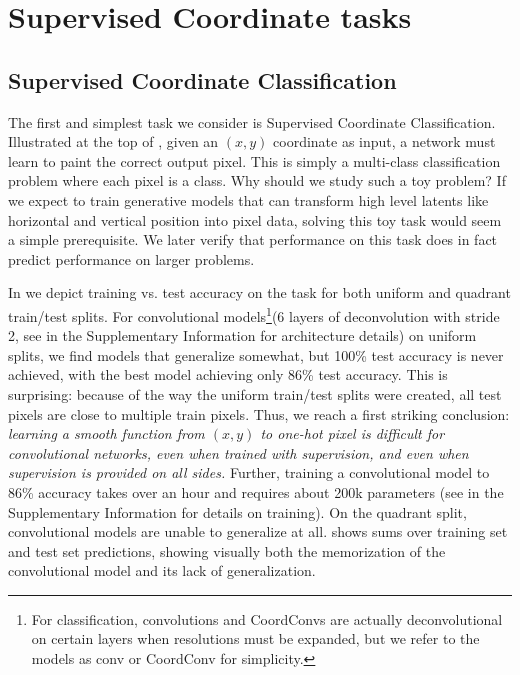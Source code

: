 \documentclass{article}
\begin{document}
\vspace*{-.5em}
\section{Supervised Coordinate tasks}
\vspace*{-.6em}

\subsection{Supervised Coordinate Classification}
\vspace*{-.6em}

The first and simplest task we consider is Supervised Coordinate Classification.
Illustrated at the top of , given an $(x,y)$ coordinate as input, a network must learn to paint the correct output pixel. This is simply a multi-class classification problem where each pixel is a class.
Why should we study such a toy problem? If we expect to train generative models that can transform high level latents like horizontal and vertical position into pixel data, solving this toy task would seem a simple prerequisite. We later verify that performance on this task does in fact predict performance on larger problems.

In  we depict training vs. test accuracy on the task for both uniform and quadrant train/test splits.
For convolutional models\footnote{For classification, convolutions and CoordConvs are actually deconvolutional on certain layers when resolutions must be expanded, but we refer to the models as conv or CoordConv for simplicity.}(6 layers of deconvolution with stride 2, see   in the Supplementary Information for architecture details) on uniform splits, we find models that generalize somewhat, but 100\% test accuracy is never achieved, with the best model achieving only 86\% test accuracy. This is surprising: because of the way the uniform train/test splits were created, all test pixels are close to multiple train pixels.
Thus, we reach a first striking conclusion: \emph{learning a smooth function from $(x,y)$ to one-hot pixel is difficult for convolutional networks, even when trained with supervision, and even when supervision is provided on all sides.}
Further, training a convolutional model to 86\% accuracy takes over an hour and requires about 200k parameters (see  in the Supplementary Information for details on training).
On the quadrant split, convolutional models are unable to generalize at all.  shows sums over training set and test set predictions, showing visually both the memorization of the convolutional model and its lack of generalization.
\end{document}
